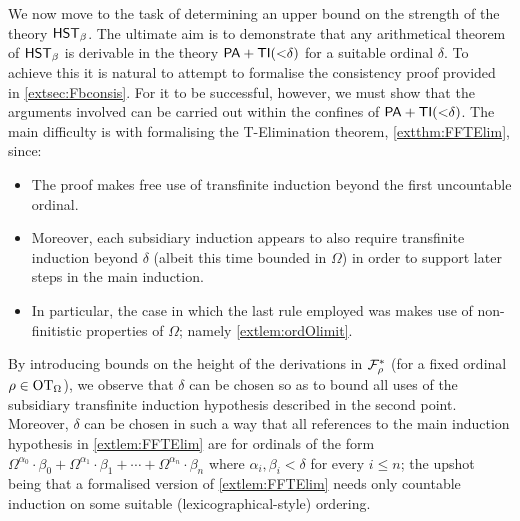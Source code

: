 \documentclass[UKenglish,cleveref,DIV=12]{scrartcl}
\theoremstyle{definition}
\theoremstyle{definition}
\begin{document}
We now move to the task of determining an upper bound on the strength of the theory
$\mathsf{HST}_\beta$. The ultimate aim is to demonstrate that any arithmetical theorem of
$\mathsf{HST}_\beta$ is derivable in the theory $\mathsf{PA}+\mathsf{TI}(\mathord<\delta)$ for a suitable
ordinal $\delta$. To achieve this it is natural to attempt to formalise the consistency proof provided in \cref{extsec:Fbconsis}. For it to be successful, however, we must show that the arguments involved can be carried out within the confines of
$\mathsf{PA}+\mathsf{TI}(\mathord<\delta)$. The main difficulty is with formalising the T-Elimination theorem, \cref{extthm:FFTElim}, since:
\begin{itemize}
 \item The proof
  makes free use of transfinite induction beyond the first uncountable ordinal.
 \item Moreover, each subsidiary induction appears to also require transfinite
  induction beyond $\delta$ (albeit this time bounded in $\Omega$) in order to
  support later steps in the main induction.
 \item In particular, the case in which the last rule employed was \Uni\eta
  makes use of non-finitistic properties of $\Omega$; namely
  \cref{extlem:ordOlimit}.
\end{itemize}
By introducing bounds on the height of the derivations in $\mathcal{F}_\rho^*$ (for a fixed ordinal $\rho\in\mathrm{OT}_\Omega$), we observe that $\delta$ can be chosen so as to bound all uses of the subsidiary transfinite induction hypothesis described in the second point.
Moreover, $\delta$ can be
chosen in such a way that all references to the main induction hypothesis in
\cref{extlem:FFTElim} are for ordinals of the form
\linebreak$\Omega^{\alpha_0}\cdot\beta_0+\Omega^{\alpha_1}\cdot\beta_1+\cdots+\Omega^{
\alpha_n}\cdot\beta_n$ where $\alpha_i,\beta_i<\delta$ for every $i\le n$; the
upshot being that a formalised version of \cref{extlem:FFTElim} needs only countable induction on some suitable (lexicographical-style) ordering.
\end{document}
